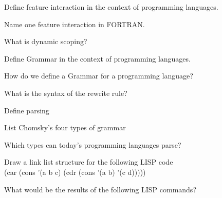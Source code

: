 \documentclass{exam} %
\begin{document}
\begin{questions}
  \pagebreak

  \question Define feature interaction in the context of programming languages.


  \question Name one feature interaction in FORTRAN.

  \question What is dynamic scoping?

  \question Define Grammar in the context of programming languages.

  \question How do we define a Grammar for a programming language?

  \question What is the syntax of the rewrite rule?


  \question Define parsing

  \question List Chomsky's four types of grammar

  \question Which types can today's programming languages parse?

  \question Draw a link list structure for the following LISP code \\ (car (cons '(a b c) (cdr (cons '(a b) '(c d)))))

  \question What would be the results of the following LISP commands?


\end{questions}
\end{document}
